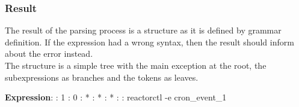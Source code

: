 \subsubsection{Result}
The result of the parsing process is a structure as it is defined by grammar definition. If the expression had a wrong syntax, then
the result should inform about the error instead.\\
The structure is a simple tree with the main exception at the root, the subexpressions as branches and the tokens as leaves. 
\begin{list}{-}{Our example's result would look like this:}
  \item {\bf Expression}:
    : 1
    : 0
    : *
    : *
    : *
    :
      : reactorctl -e cron\_event\_1
\end{list}
